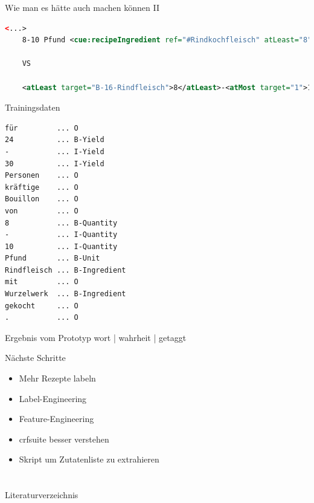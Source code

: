 \documentclass[12pt]{beamer}
\begin{document}
\begin{frame}[fragile]{Wie man es hätte auch machen können II}
	\begin{lstlisting}[language=XML]
	<...>
	8-10 Pfund <cue:recipeIngredient ref="#Rindkochfleisch" atLeast="8" atMost="10" unit="Pfund">Rindfleisch</cue:recipeIngredient>
	
	VS
	
	<atLeast target="B-16-Rindfleisch">8</atLeast>-<atMost target="1">10</atMost> <unit target="B-16-Rindfleisch">Pfund</unit> <recipeIngredient xml:id="B-16-Rindfleisch" ref="#Suppenrindfleisch">Rindfleisch</recipeIngredient>
	\end{lstlisting}
\end{frame}

\begin{frame}[fragile]{Trainingsdaten}
	\vspace{-0.7em}\begin{lstlisting}
für			...	O
24			... B-Yield
-			... I-Yield
30			... I-Yield
Personen	...	O
kräftige	... O
Bouillon	... O
von			...	O
8			...	B-Quantity
-			...	I-Quantity
10			...	I-Quantity
Pfund		...	B-Unit
Rindfleisch	... B-Ingredient
mit			...	O
Wurzelwerk	...	B-Ingredient
gekocht		...	O
.			...	O
	\end{lstlisting}
\end{frame}	

\begin{frame}{Ergebnis vom Prototyp}
	wort | wahrheit | getaggt
\end{frame}


\begin{frame}{Nächste Schritte}
	\begin{itemize}
		\item Mehr Rezepte labeln
		\item Label-Engineering
		\item Feature-Engineering
		\item crfsuite besser verstehen
		\item Skript um Zutatenliste zu extrahieren
	\end{itemize}
\end{frame}
	
\section{}
\begin{frame}[t,allowframebreaks]{Literaturverzeichnis}
	\printbibliography[heading=none]
\end{frame}
\end{document}
